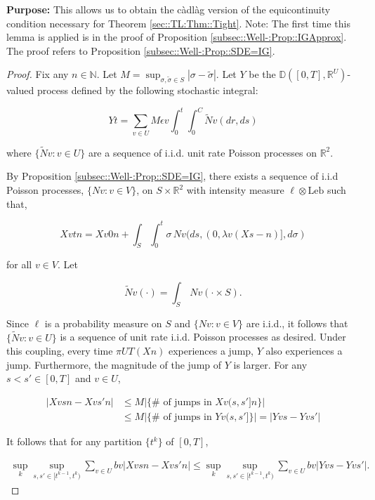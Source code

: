 \documentclass[12pt]{article}
\newcommand{\mb}{\mathbb}
\newcommand{\te}{\text}
\newcommand{\ep}{\epsilon}
\newcommand{\purpose}{\textbf{Purpose: }}
\newcommand{\ind}{\hspace{24pt}}
\newcommand{\cad}{\mb{D}}							%
\renewcommand{\v}{v}							%
\renewcommand{\U}{U}							%
\renewcommand{\S}{S}							%
\newcommand{\s}{\sigma}							%
\renewcommand{\b}{b}							%
\newcommand{\ev}{\ep}							%
\newcommand{\T}{T}								%
\renewcommand{\t}{t}							%
\newcommand{\proj}{\pi}							%
\renewcommand{\tt}{s}							%
\newcommand{\ttt}{s'}							%
\newcommand{\X}{X}								%
\newcommand{\const}{C}							%
\newcommand{\sln}[1]{^{#1}}						%
\renewcommand{\ss}{\tilde{\s}}					%
\newcommand{\poiss}{N}							%
\newcommand{\leb}{\te{Leb}}						%
\newcommand{\Sm}{\ell}							%
\newcommand{\rate}{\lambda}						%
\renewcommand{\r}{r}							%
\newcommand{\alt}[1]{\widetilde{#1}}			%
\newcommand{\XX}{Y}								%
\renewcommand{\it}{k}							%
\begin{document}
\purpose This allows us to obtain the c\`adl\`ag version of the equicontinuity condition necessary for Theorem \ref{sec::TL:Thm::Tight}. Note: The first time this lemma is applied is in the proof of Proposition \ref{subsec::Well-:Prop::IGApprox}. The proof refers to Proposition \ref{subsec::Well-:Prop::SDE=IG}.

\begin{proof}
Fix any \(n \in \mb{N}\). Let \(M = \sup_{\s,\ss \in \S} |\s - \ss|\). Let \(\XX{}{}\) be the \(\cad([0,\T],\mb{R}^\U)\)-valued process defined by the following stochastic integral:

\[\XX{}{\t} = \sum_{\v \in \U}M\ev{\v}\int_0^\t\int_0^{\const{}}\alt{\poiss}{\v}(d\r, d\tt)\]

where \(\{\alt{\poiss}{\v}:\v \in \U\}\) are a sequence of i.i.d. unit rate Poisson processes on \(\mb{R}^2\). 

\ind By Proposition \ref{subsec::Well-:Prop::SDE=IG}, there exists a sequence of i.i.d Poisson processes, \(\{\poiss{\v}:\v\in  V\}\), on \(\S\times\mb{R}^2\) with intensity measure \(\Sm\otimes \leb\) such that,

\[\X{\v}{\t}{n} = \X{\v}{0}{n} + \int_\S\int_0^\t \s\,\poiss{\v}(d\tt,(0,\rate{\v}(\X{}{\tt-}{n})],d\s)\]

for all \(\v\in  V\). Let

\[\alt{\poiss}{\v}(\cdot) = \int_\S\,\poiss{\v}(\cdot\times \S).\]

Since \(\Sm\) is a probability measure on \(\S\) and \(\{\poiss{\v}:\v\in  V\}\) are i.i.d., it follows that \(\{\alt{\poiss}{\v}:\v\in \U\}\) is a sequence of unit rate i.i.d. Poisson processes as desired. Under this coupling, every time \(\proj{\U}{\T}(\X{}{}{n})\) experiences a jump, \(\XX{}{}\) also experiences a jump. Furthermore, the magnitude of the jump of \(\XX{}{}\) is larger. For any \(\tt<\ttt\in [0,\T]\) and \(\v\in \U\),

\begin{align*}
|\X{\v}{\tt}{n} - \X{\v}{\ttt}{n}|&\leq M\left|\{\#\te{ of jumps in }\X{\v}{(\tt,\ttt]}{n}\}\right| \\
&\leq M\left|\{\#\te{ of jumps in }\XX{\v}{(\tt,\ttt]}\}\right| = \left|\XX{\v}{\tt} - \XX{\v}{\ttt}\right|
\end{align*}

It follows that for any partition \(\{\t\sln{\it}\}\) of \([0,\T]\),

\begin{align*}
\sup_\it\sup_{\tt,\ttt \in [\t\sln{\it-1},\t\sln{\it})} \sum_{\v\in \U} \b{\v}|\X{\v}{\tt}{n} - \X{\v}{\ttt}{n}|\leq \sup_\it\sup_{\tt,\ttt \in [\t\sln{\it-1},\t\sln{\it})} \sum_{\v\in \U} \b{\v}|\XX{\v}{\tt} - \XX{\v}{\ttt}|.
\end{align*}


\end{proof}
\end{document}
